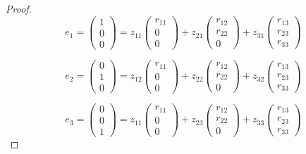\documentclass{article}
\begin{document}
\begin{proof}
    \[e_1 =
        \begin{pmatrix}
            1 \\
            0 \\
            0
        \end{pmatrix} 
        =
        z_{11}\begin{pmatrix}
            r_{11} \\
            0 \\
            0
        \end{pmatrix}
        +
        z_{21} \begin{pmatrix}
            r_{12} \\
            r_{22} \\
            0
        \end{pmatrix}
        +
        z_{31} \begin{pmatrix}
            r_{13} \\
            r_{23} \\
            r_{33}
        \end{pmatrix}
    \]

    \[e_2 =
    \begin{pmatrix}
        0 \\
        1 \\
        0
    \end{pmatrix} 
    =
    z_{12}\begin{pmatrix}
        r_{11} \\
        0 \\
        0
    \end{pmatrix}
    +
    z_{22} \begin{pmatrix}
        r_{12} \\
        r_{22} \\
        0
    \end{pmatrix}
    +
    z_{32} \begin{pmatrix}
        r_{13} \\
        r_{23} \\
        r_{33}
    \end{pmatrix}
\]

\[e_3 =
\begin{pmatrix}
    0 \\
    0 \\
    1
\end{pmatrix} 
=
z_{11}\begin{pmatrix}
    r_{11} \\
    0 \\
    0
\end{pmatrix}
+
z_{23} \begin{pmatrix}
    r_{12} \\
    r_{22} \\
    0
\end{pmatrix}
+
z_{33} \begin{pmatrix}
    r_{13} \\
    r_{23} \\
    r_{33}
\end{pmatrix}
\]


\end{proof}
\end{document}
